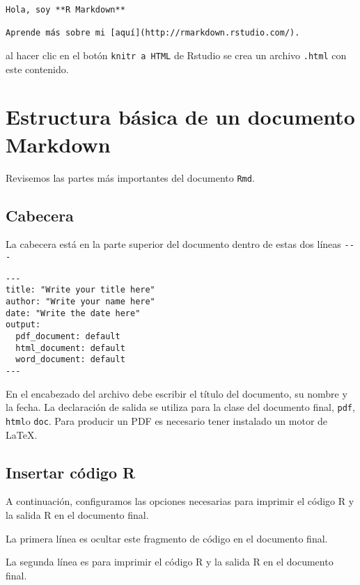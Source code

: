 \documentclass[
]{book}
\begin{document}
\begin{verbatim}
Hola, soy **R Markdown**

Aprende más sobre mi [aquí](http://rmarkdown.rstudio.com/).
\end{verbatim}

al hacer clic en el botón \texttt{knitr\ a\ HTML} de Rstudio se crea un archivo \texttt{.html} con este contenido.

\hypertarget{estructura-buxe1sica-de-un-documento-markdown}{%
\section{Estructura básica de un documento Markdown}\label{estructura-buxe1sica-de-un-documento-markdown}}

Revisemos las partes más importantes del documento \texttt{Rmd}.

\hypertarget{cabecera}{%
\subsection{Cabecera}\label{cabecera}}

La cabecera está en la parte superior del documento dentro de estas dos líneas \texttt{-\/-\/-}

\begin{verbatim}
---
title: "Write your title here"
author: "Write your name here"
date: "Write the date here"
output:
  pdf_document: default
  html_document: default
  word_document: default
---
\end{verbatim}

En el encabezado del archivo debe escribir el título del documento, su nombre y la fecha. La declaración de salida se utiliza para la clase del documento final, \texttt{pdf}, \texttt{html}o \texttt{doc}. Para producir un PDF es necesario tener instalado un motor de LaTeX.

\hypertarget{insertar-cuxf3digo-r}{%
\subsection{Insertar código R}\label{insertar-cuxf3digo-r}}

A continuación, configuramos las opciones necesarias para imprimir el código R y la salida R en el documento final.

La primera línea es ocultar este fragmento de código en el documento final.

La segunda línea es para imprimir el código R y la salida R en el documento final.
\end{document}
